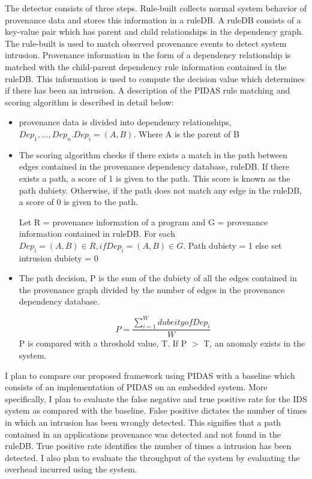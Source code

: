 The detector consists of three steps. Rule-built collects normal system behavior of provenance data and stores this information in a ruleDB. A ruleDB consists of a key-value pair which has parent and child relationships in the dependency graph. The rule-built is used to match observed provenance events  to detect system intrusion. Provenance information in the form of a dependency relationship is matched with the child-parent dependency rule information contained in the ruleDB. This information is used to compute the decision value which determines if there has been an intrusion.  A description of the PIDAS rule matching and scoring algorithm is described in detail below: 

\begin{itemize}

\item provenance data is divided into dependency relationships, $Dep_1,...,Dep_n. Dep_i =(A, B)$. Where A is the parent of B

\item The scoring algorithm checks if there exists a match in the path between edges contained in the provenance dependency database, ruleDB. If there exists a path, a score of 1 is given to the path. This score is known as the path dubiety. Otherwise, if the path does not match any edge in the ruleDB, a score of 0 is given to the path.

Let R = provenance information of a program and G = provenance information contained in ruleDB. For each $Dep_i = (A, B) \in R, if Dep_i = (A, B) \in G$. Path dubiety = 1 else set intrusion dubiety = 0

\item The path decision, P is the sum of the dubiety of all the edges contained in the provenance graph divided by the number of edges in the provenance dependency database.

 \[P =\frac{\sum\limits_{i=1}^W dubeity of Dep_i }{W} \] P is compared with a threshold value, T. If P $>$ T, an anomaly exists in the system.

\end{itemize}

I plan to compare our proposed framework using PIDAS with a baseline which consists of an implementation of PIDAS on an embedded system. More specifically, I plan to evaluate the false negative and true positive rate for the IDS system as compared with the baseline. False positive dictates the number of times in which an intrusion has been wrongly detected. This signifies that a path contained in an applications provenance was detected and not found in the ruleDB. True positive rate identifies the number of times a intrusion has been detected. I also plan to evaluate the throughput of the system by evaluating the overhead incurred using the system.



%
